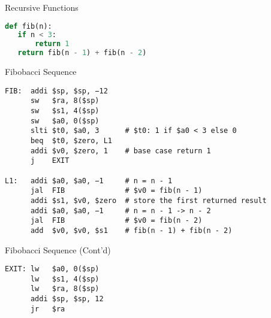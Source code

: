 \begin{frame}[fragile]{Recursive Functions}
\begin{lstlisting}[keywordstyle=\color{purple}\textbf, language=python]
def fib(n):
   if n < 3:
       return 1
   return fib(n - 1) + fib(n - 2)
\end{lstlisting}    
\end{frame}

\begin{frame}[fragile]{Fibobacci Sequence}
\begin{lstlisting}[keywordstyle=\color{purple}\textbf, numbers=none, keywords={addi, sw, slti, beq, j, jal, add}]
FIB:  addi $sp, $sp, −12
      sw   $ra, 8($sp)
      sw   $s1, 4($sp)
      sw   $a0, 0($sp)
      slti $t0, $a0, 3      # $t0: 1 if $a0 < 3 else 0
      beq  $t0, $zero, L1
      addi $v0, $zero, 1    # base case return 1
      j    EXIT

L1:   addi $a0, $a0, −1     # n = n - 1
      jal  FIB              # $v0 = fib(n - 1)
      addi $s1, $v0, $zero  # store the first returned result
      addi $a0, $a0, −1     # n = n - 1 -> n - 2 
      jal  FIB              # $v0 = fib(n - 2)
      add  $v0, $v0, $s1    # fib(n - 1) + fib(n - 2)
\end{lstlisting}    
\end{frame}

\begin{frame}[fragile]{Fibobacci Sequence (Cont'd)}
\begin{lstlisting}[keywordstyle=\color{purple}\textbf, numbers=none, keywords={lw, addi, jr}]
EXIT: lw   $a0, 0($sp)
      lw   $s1, 4($sp)
      lw   $ra, 8($sp)
      addi $sp, $sp, 12
      jr   $ra
\end{lstlisting}    
\end{frame}

